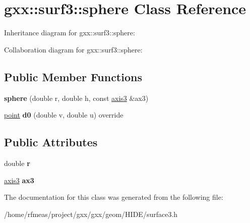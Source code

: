 \hypertarget{classgxx_1_1surf3_1_1sphere}{}\section{gxx\+:\+:surf3\+:\+:sphere Class Reference}
\label{classgxx_1_1surf3_1_1sphere}


Inheritance diagram for gxx\+:\+:surf3\+:\+:sphere\+:


Collaboration diagram for gxx\+:\+:surf3\+:\+:sphere\+:
\subsection*{Public Member Functions}
\begin{DoxyCompactItemize}
\item 
{\bfseries sphere} (double r, double h, const \hyperlink{classgxx_1_1geom3_1_1axis3}{axis3} \&ax3)\hypertarget{classgxx_1_1surf3_1_1sphere_a2723be12a5d4f0cde6d878a717f860b4}{}\label{classgxx_1_1surf3_1_1sphere_a2723be12a5d4f0cde6d878a717f860b4}

\item 
\hyperlink{classgxx_1_1geom3_1_1point}{point} {\bfseries d0} (double v, double u) override\hypertarget{classgxx_1_1surf3_1_1sphere_ab0fb9a7c107e66fc1c1ba7dab90183d8}{}\label{classgxx_1_1surf3_1_1sphere_ab0fb9a7c107e66fc1c1ba7dab90183d8}

\end{DoxyCompactItemize}
\subsection*{Public Attributes}
\begin{DoxyCompactItemize}
\item 
double {\bfseries r}\hypertarget{classgxx_1_1surf3_1_1sphere_a7cd8411a0f80b75775d9567aa2bb15a5}{}\label{classgxx_1_1surf3_1_1sphere_a7cd8411a0f80b75775d9567aa2bb15a5}

\item 
\hyperlink{classgxx_1_1geom3_1_1axis3}{axis3} {\bfseries ax3}\hypertarget{classgxx_1_1surf3_1_1sphere_aee9b9576ec49bf0e015ab3e7adfecbf7}{}\label{classgxx_1_1surf3_1_1sphere_aee9b9576ec49bf0e015ab3e7adfecbf7}

\end{DoxyCompactItemize}


The documentation for this class was generated from the following file\+:\begin{DoxyCompactItemize}
\item 
/home/rfmeas/project/gxx/gxx/geom/\+H\+I\+D\+E/surface3.\+h\end{DoxyCompactItemize}
